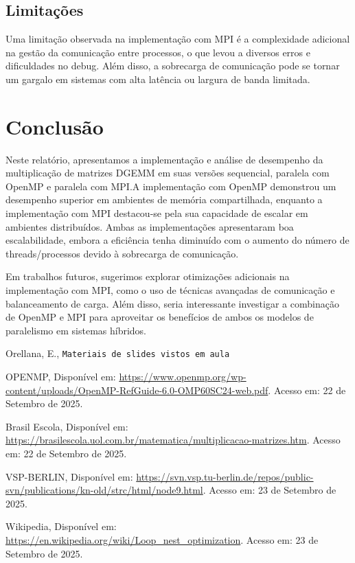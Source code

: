 \documentclass[12pt, a4paper]{article}
\begin{document}
    \subsection{Limitações}

    Uma limitação observada na implementação com MPI é a complexidade adicional na gestão da comunicação entre processos, o que levou a diversos erros e dificuldades no debug. Além disso, a sobrecarga de comunicação pode se tornar um gargalo em sistemas com alta latência ou largura de banda limitada.

    \newpage
    \section{Conclusão}\label{sec:conclusao}

    Neste relatório, apresentamos a implementação e análise de desempenho da multiplicação de matrizes DGEMM em suas versões sequencial, paralela com OpenMP e paralela com MPI.A implementação com OpenMP demonstrou um desempenho superior em ambientes de memória compartilhada, enquanto a implementação com MPI destacou-se pela sua capacidade de escalar em ambientes distribuídos. Ambas as implementações apresentaram boa escalabilidade, embora a eficiência tenha diminuído com o aumento do número de threads/processos devido à sobrecarga de comunicação.

    Em trabalhos futuros, sugerimos explorar otimizações adicionais na implementação com MPI, como o uso de técnicas avançadas de comunicação e balanceamento de carga. Além disso, seria interessante investigar a combinação de OpenMP e MPI para aproveitar os benefícios de ambos os modelos de paralelismo em sistemas híbridos.

    \newpage
    \begin{thebibliography}{9}
    \raggedright{}
         Orellana, E., \texttt{Materiais de slides vistos em aula}

         OPENMP, Disponível em: \url{https://www.openmp.org/wp-content/uploads/OpenMP-RefGuide-6.0-OMP60SC24-web.pdf}. Acesso em: 22 de Setembro de 2025.

         Brasil Escola, Disponível em: \url{https://brasilescola.uol.com.br/matematica/multiplicacao-matrizes.htm}. Acesso em: 22 de Setembro de 2025.

         VSP-BERLIN, Disponível em: \url{https://svn.vsp.tu-berlin.de/repos/public-svn/publications/kn-old/strc/html/node9.html}. Acesso em: 23 de Setembro de 2025.

         Wikipedia, Disponível em: \url{https://en.wikipedia.org/wiki/Loop\_nest\_optimization}. Acesso em: 23 de Setembro de 2025.
    \end{thebibliography}
\end{document}
